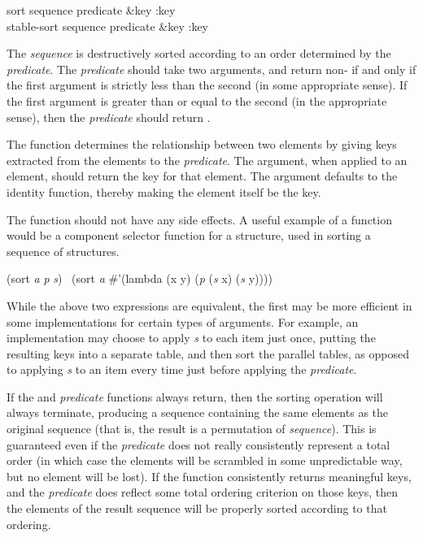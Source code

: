 \begin{defun}[Function]
sort sequence predicate &key :key \\
stable-sort sequence predicate &key :key

The \emph{sequence} is destructively sorted according to an order determined by
the \emph{predicate}.  The \emph{predicate} should take two
arguments, and return non-{\false} if and only if the first argument is
strictly less than the second (in some appropriate sense). 
If the first argument is greater than or equal to the second
(in the appropriate sense), then the \emph{predicate} should return {\false}.

The  function determines the relationship between two elements
by giving keys extracted from the elements to the \emph{predicate}.
The  argument, when applied to an element, should return
the key for that element.  The  argument defaults to the identity
function, thereby making the element itself be the key.

The  function should not have any side effects.
A useful example of a  function would be a component
selector function for a  structure, used in sorting
a sequence of structures.
\begin{lisp}
(sort \emph{a} \emph{p}  \emph{s})
   \EQ\ (sort \emph{a} \#'(lambda (x y) (\emph{p} (\emph{s} x) (\emph{s} y))))
\end{lisp}
While the above two expressions are equivalent, the first may be more
efficient in some implementations for certain types of arguments.  For
example, an implementation may choose to apply \emph{s} to each
item just once, putting the resulting keys into a separate table, and
then sort the parallel tables, as opposed to applying
\emph{s} to an item every time just before applying the \emph{predicate}.

If the  and \emph{predicate} functions always return, then the
sorting operation will always terminate, producing a sequence containing
the same elements as the original sequence (that is, the result is a
permutation of \emph{sequence}).  This is guaranteed even if the
\emph{predicate} does not really consistently represent a total order
(in which case the elements will be scrambled in some unpredictable
way, but no element will be lost).  If
the  function consistently returns meaningful keys,
and the \emph{predicate}
does reflect some total ordering criterion on those keys, then the
elements of the result sequence will be properly sorted according
to that ordering.


\end{defun}
